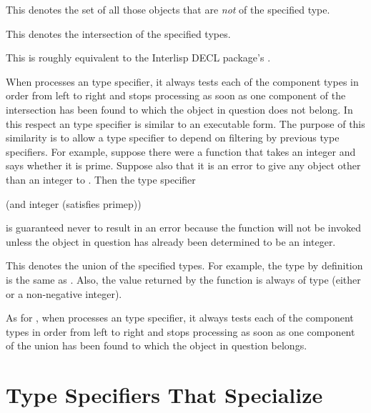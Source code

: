 \begin{flushdesc}
\item[\cd{(not \emph{type})}]
This denotes the set of all those objects that
are \emph{not} of the specified type.

\item[\cd{(and \emph{type1} \emph{type2} ...)}]
This denotes the intersection of
the specified types.

\beforenoterule
\begin{incompatibility}
This is roughly equivalent to
the Interlisp DECL package's .
\end{incompatibility}
\afternoterule

When  processes an  type specifier, it always
tests each of the component types in order from left to right
and stops processing as soon as one component of the intersection has
been found to which the object in question does not belong.
In this respect an  type specifier is similar to an
executable  form.  The purpose of this similarity is to allow
a  type specifier to depend on filtering by previous
type specifiers.  For example, suppose there were a function 
that takes an integer and says whether it is prime.  Suppose also that
it is an error to give any object other than an integer to .
Then the type specifier
\begin{lisp}
(and integer (satisfies primep))
\end{lisp}
is guaranteed never to result in an error because the function 
will not be invoked unless the object in question has already been
determined to be an integer.

\item[\cd{(or \emph{type1} \emph{type2} ...)}]
This denotes the union of the
specified types.  For example, the type  by definition is the same as
.  Also, the value returned by the function
 is always of type 
(either {\nil} or a non-negative integer).

As for ,
when  processes an  type specifier, it always
tests each of the component types in order from left to right
and stops processing as soon as one component of the union has
been found to which the object in question belongs.
\end{flushdesc}

\section{Type Specifiers That Specialize}
\label{SPECIALIZED-TYPE-SPECIFIER-SECTION}


